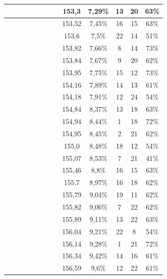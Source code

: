 \begin{center}
\begin{longtable}{|c|c|c|c|c|c|c|c|c|c|c|c|c|}
 \x &  &  \x &  \x &  \x &  &  \x &  \x & 153,3 & 7,29\% & 13 & 20 & 63\% \\ \hline
 \x &  &  \x &  \x &  &  &  \x &  \x & 153,52 & 7,45\% & 16 & 15 & 63\% \\ \hline
 \x &  &  &  \x &  &  &  &  \x & 153,6 & 7,5\% & 22 & 14 & 51\% \\ \hline
 \x &  \x &  \x &  &  &  \x &  \x &  \x & 153,82 & 7,66\% & 8 & 14 & 73\% \\ \hline
 \x &  &  \x &  \x &  \x &  &  &  \x & 153,84 & 7,67\% & 9 & 20 & 62\% \\ \hline
 \x &  &  &  &  \x &  \x &  &  \x & 153,95 & 7,75\% & 15 & 12 & 73\% \\ \hline
 \x &  &  \x &  &  \x &  &  &  \x & 154,16 & 7,89\% & 14 & 13 & 61\% \\ \hline
 \x &  \x &  &  \x &  &  &  &  \x & 154,18 & 7,91\% & 12 & 24 & 54\% \\ \hline
 \x &  \x &  \x &  \x &  &  &  \x &  \x & 154,84 & 8,37\% & 13 & 18 & 63\% \\ \hline
 \x &  &  &  \x &  \x &  \x &  \x &  \x & 154,94 & 8,44\% & 1 & 18 & 72\% \\ \hline
 \x &  \x &  \x &  \x &  &  &  \x &  \x & 154,95 & 8,45\% & 2 & 21 & 62\% \\ \hline
 \x &  \x &  &  \x &  &  &  \x &  \x & 155,0 & 8,48\% & 18 & 12 & 54\% \\ \hline
 \x &  &  &  &  &  &  &  \x & 155,07 & 8,53\% & 7 & 21 & 41\% \\ \hline
 \x &  \x &  \x &  &  \x &  &  \x &  \x & 155,46 & 8,8\% & 16 & 15 & 63\% \\ \hline
 \x &  &  \x &  \x &  \x &  &  \x &  \x & 155,7 & 8,97\% & 16 & 18 & 62\% \\ \hline
 \x &  \x &  \x &  \x &  \x &  &  &  \x & 155,79 & 9,04\% & 19 & 11 & 62\% \\ \hline
 \x &  \x &  \x &  &  &  &  \x &  \x & 155,82 & 9,06\% & 7 & 22 & 62\% \\ \hline
 \x &  &  \x &  \x &  &  &  \x &  \x & 155,89 & 9,11\% & 13 & 22 & 63\% \\ \hline
 \x &  \x &  &  &  &  &  \x &  \x & 156,04 & 9,21\% & 22 & 8 & 54\% \\ \hline
 \x &  &  &  \x &  &  \x &  &  \x & 156,14 & 9,28\% & 1 & 21 & 72\% \\ \hline
 \x &  \x &  &  &  \x &  &  \x &  \x & 156,34 & 9,42\% & 14 & 16 & 61\% \\ \hline
 \x &  &  &  \x &  \x &  &  \x &  \x & 156,59 & 9,6\% & 12 & 22 & 61\% \\ \hline

\end{longtable}
\end{center}
